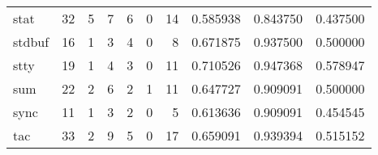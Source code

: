 \begin{longtable}{lrrrrrrrrr}
stat      &                                      32 &                                                  5 &                                                  7 &                                                  6 &                                                  0 &                                                 14 &                                           0.585938 &                               0.843750 &                             0.437500 \\
stdbuf    &                                      16 &                                                  1 &                                                  3 &                                                  4 &                                                  0 &                                                  8 &                                           0.671875 &                               0.937500 &                             0.500000 \\
stty      &                                      19 &                                                  1 &                                                  4 &                                                  3 &                                                  0 &                                                 11 &                                           0.710526 &                               0.947368 &                             0.578947 \\
sum       &                                      22 &                                                  2 &                                                  6 &                                                  2 &                                                  1 &                                                 11 &                                           0.647727 &                               0.909091 &                             0.500000 \\
sync      &                                      11 &                                                  1 &                                                  3 &                                                  2 &                                                  0 &                                                  5 &                                           0.613636 &                               0.909091 &                             0.454545 \\
tac       &                                      33 &                                                  2 &                                                  9 &                                                  5 &                                                  0 &                                                 17 &                                           0.659091 &                               0.939394 &                             0.515152 \\

\end{longtable}
